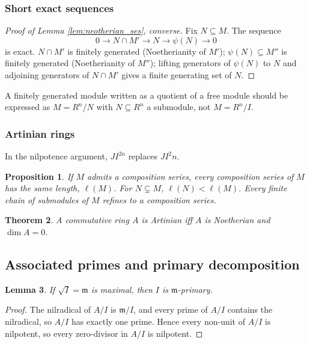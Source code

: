 \documentclass[12pt]{article}
\theoremstyle{plain}
\newtheorem{thm}{Theorem}[subsection] %
\newtheorem{proposition}[thm]{Proposition}
\newtheorem{lemma}[thm]{Lemma}
\theoremstyle{definition}
\begin{document}
\subsubsection*{Short exact sequences}

\begin{proof}[Proof of Lemma \ref{lem:neotherian_ses}, converse]
Fix $N\subseteq M$. The sequence
\[
0\longrightarrow N\cap M'\longrightarrow N\longrightarrow\psi(N)\longrightarrow 0
\]
is exact. $N\cap M'$ is finitely generated (Noetherianity of $M'$); $\psi(N)\subseteq M''$ is finitely generated (Noetherianity of $M''$); lifting generators of $\psi(N)$ to $N$ and adjoining generators of $N\cap M'$ gives a finite generating set of $N$.
\end{proof}

A finitely generated module written as a quotient of a free module should be expressed as $M=R^n/N$ with $N\subseteq R^n$ a submodule, not $M=R^n/I$.

\subsubsection*{Artinian rings}

In the nilpotence argument, $JI^{2n}$ replaces $JI^2n$.

\begin{proposition}
If $M$ admits a composition series, every composition series of $M$ has the same length, $\ell(M)$. For $N\subsetneq M$, $\ell(N)<\ell(M)$. Every \emph{finite} chain of submodules of $M$ refines to a composition series.
\end{proposition}

\begin{thm}
A commutative ring $A$ is Artinian iff $A$ is Noetherian and $\dim A=0$.
\end{thm}

\subsection{Associated primes and primary decomposition}

\begin{lemma}
If $\sqrt{I}=\mathfrak{m}$ is maximal, then $I$ is $\mathfrak{m}$-primary.
\end{lemma}
\begin{proof}
The nilradical of $A/I$ is $\mathfrak{m}/I$, and every prime of $A/I$ contains the nilradical, so $A/I$ has exactly one prime. Hence every non-unit of $A/I$ is nilpotent, so every zero-divisor in $A/I$ is nilpotent.
\end{proof}
\end{document}
